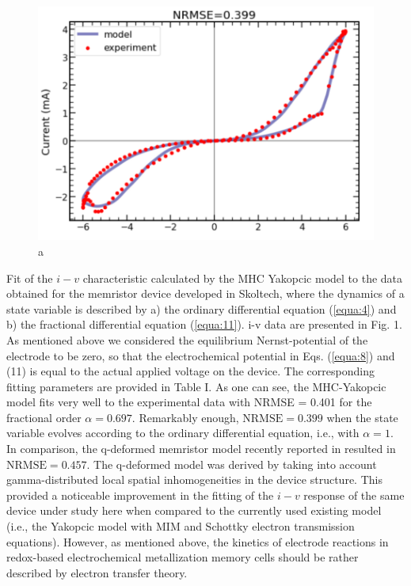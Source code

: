 \documentclass[10pt]{article}
\begin{document}
\begin{multicols}{2}
        \begin{figure}[b]
            \includegraphics[scale=1]{latex_figure_a}
            \caption{a}
            \label{fig:my_label}
        \end{figure}
        Fit of the $i-v$ characteristic calculated by the MHC Yakopcic model to the data obtained for the memristor device developed in Skoltech, where the dynamics of a state variable is described by a) the ordinary differential equation (\ref{equa:4}) and b) the fractional differential equation (\ref{equa:11}).
        i-v data are presented in Fig. 1. As mentioned above we considered the equilibrium Nernst-potential of the electrode to be zero, so that the electrochemical potential in Eqs. (\ref{equa:8}) and (11) is equal to the actual applied voltage on the device. The corresponding fitting parameters are provided in Table I. As one can see, the MHC-Yakopcic model fits very well to the experimental data with NRMSE = 0.401 for the fractional order $\alpha = 0.697$. Remarkably enough, $\text{NRMSE} = 0.399$ when the state variable evolves according to the ordinary differential equation, i.e., with $\alpha = 1$. In comparison, the q-deformed memristor model recently reported in resulted in $\text{NRMSE} = 0.457$. The q-deformed model was derived by taking into account gamma-distributed local spatial inhomogeneities in the device structure. This provided a noticeable improvement in the fitting of the $i-v$ response of the same device under study here when compared to the currently used existing model (i.e., the Yakopcic model with MIM and Schottky electron transmission equations). However, as mentioned above, the kinetics of electrode reactions in redox-based electrochemical metallization memory cells should be rather described by electron transfer theory. \par

\end{multicols}
\end{document}
